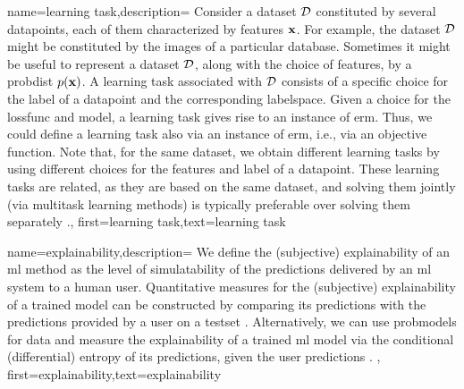 {name={learning task},description=
	{Consider a \gls{dataset} $\mathcal{D}$ constituted by several \gls{datapoint}s, each of them 
	 characterized by \gls{feature}s ${\bf x}$. For example, the \gls{dataset} $\mathcal{D}$ 
	 might be constituted by the images of a particular database. Sometimes it might be useful 
	 to represent a \gls{dataset} $\mathcal{D}$, along with the choice of \gls{feature}s, by a \gls{probdist} $p({\bf x})$. 
	 A learning task associated with $\mathcal{D}$ consists of a specific 
	 choice for the \gls{label} of a \gls{datapoint} and the corresponding \gls{labelspace}. 
	 Given a choice for the \gls{lossfunc} and \gls{model}, a learning task gives rise to an 
	 instance of \gls{erm}. Thus, we could define a learning task also via an instance of \gls{erm}, i.e., 
	 via an objective function.  Note that, for the same \gls{dataset}, we obtain different learning tasks by using 
	 different choices for the \gls{feature}s and \gls{label} of a \gls{datapoint}. These learning 
	 tasks are related, as they are based on the same \gls{dataset}, and solving them jointly 
	 (via multitask learning methods) is typically preferable over solving them separately \cite{Caruana:1997wk,JungGaphLassoSPL,CSGraphSelJournal}.},
	first={learning task},text={learning task}
}

{name={explainability},description=
		{We define the (subjective) explainability of an \gls{ml} method 
			as the level of simulatability \cite{Colin:2022aa} of the \gls{prediction}s 
			delivered by an \gls{ml} system to a human user. Quantitative measures for the 
			(subjective) explainability of a trained \gls{model} can be constructed by 
			comparing its \gls{prediction}s with the \gls{prediction}s provided by a user 
			on a \gls{testset} \cite{Zhang:2024aa,Colin:2022aa}. Alternatively, we can use 
			\gls{probmodel}s for \gls{data} and measure the explainability of a trained \gls{ml} 
			model via the conditional (differential) entropy of its \gls{prediction}s, given the user \gls{prediction}s \cite{JunXML2020,Chen2018}. 
		},
		first={explainability},text={explainability}
	}

